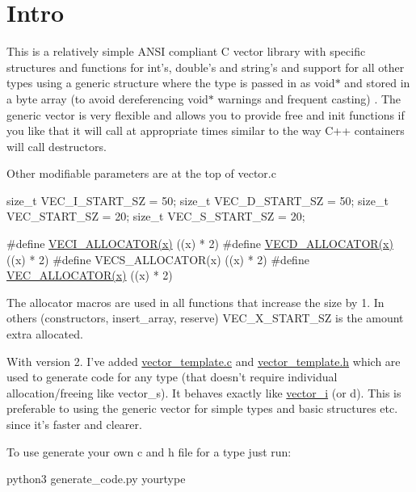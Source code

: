\hypertarget{index_Intro}{}\section{Intro}\label{index_Intro}
This is a relatively simple A\-N\-S\-I compliant C vector library with specific structures and functions for int's, double's and string's and support for all other types using a generic structure where the type is passed in as void$\ast$ and stored in a byte array (to avoid dereferencing void$\ast$ warnings and frequent casting) . The generic vector is very flexible and allows you to provide free and init functions if you like that it will call at appropriate times similar to the way C++ containers will call destructors.

Other modifiable parameters are at the top of vector.\-c 
\begin{DoxyPre}
size\_t VEC\_I\_START\_SZ = 50;
size\_t VEC\_D\_START\_SZ = 50;
size\_t VEC\_START\_SZ = 20;
size\_t VEC\_S\_START\_SZ = 20;\end{DoxyPre}



\begin{DoxyPre}#define \hyperlink{vector__i_8c_a88db9d722845b6a23eb29d044a0a3c98}{VECI\_ALLOCATOR(x)} ((x) * 2)
#define \hyperlink{vector__d_8c_af2c425102d9020ae35b894de0c7eadea}{VECD\_ALLOCATOR(x)} ((x) * 2)
#define VECS\_ALLOCATOR(x) ((x) * 2)
#define \hyperlink{vector__void_8c_acc6ff7ec59b6544f657758f724fb7a8b}{VEC\_ALLOCATOR(x)} ((x) * 2)
\end{DoxyPre}
 The allocator macros are used in all functions that increase the size by 1. In others (constructors, insert\-\_\-array, reserve) V\-E\-C\-\_\-\-X\-\_\-\-S\-T\-A\-R\-T\-\_\-\-S\-Z is the amount extra allocated.

With version 2. I've added \hyperlink{vector__template_8c}{vector\-\_\-template.\-c} and \hyperlink{vector__template_8h}{vector\-\_\-template.\-h} which are used to generate code for any type (that doesn't require individual allocation/freeing like vector\-\_\-s). It behaves exactly like \hyperlink{structvector__i}{vector\-\_\-i} (or d). This is preferable to using the generic vector for simple types and basic structures etc. since it's faster and clearer.

To use generate your own c and h file for a type just run\-: 
\begin{DoxyPre}
python3 generate\_code.py yourtype
\end{DoxyPre}


